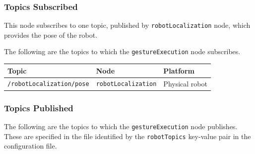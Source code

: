 \documentclass{CSSRforAfrica}
\begin{document}
{{\newpage

\subsubsection*{Topics Subscribed}
This node  subscribes to one topic, published by {\small \verb+robotLocalization+} node, which provides the pose of the robot.

The following are the topics to which the {\small \verb+gestureExecution+} node subscribes.

\begin{center}
\begin{tabularx}{\linewidth}{| l | l | X|}
\hline 
{\small Topic }                               & {\small Node }                            &  {\small Platform}       \\
\hline
{\footnotesize \verb+/robotLocalization/pose+ }  & {\footnotesize \verb+robotLocalization+}    & {\small Physical robot} \\ 
\hline
\end{tabularx}
\end{center}


\subsubsection*{Topics Published}

The following are the topics to which the {\small \verb+gestureExecution+} node publishes.
These are specified in the file identified by the {\small \verb+robotTopics+ }    key-value pair in the configuration file.

}}
\end{document}
